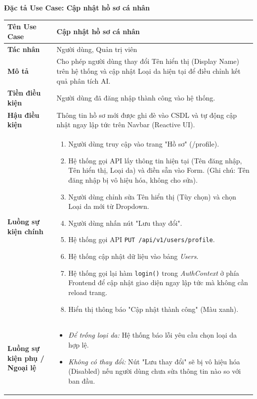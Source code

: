 \documentclass[12pt,a4paper]{article}
\begin{document}
\vspace{0.5cm}
\textbf{Đặc tả Use Case: Cập nhật hồ sơ cá nhân}

\begin{center}
\renewcommand{\arraystretch}{1.4}
\begin{tabular}{|p{4cm}|p{10cm}|}
\hline
\rowcolor{blue!15}
\textbf{Tên Use Case} & \textbf{Cập nhật hồ sơ cá nhân} \\ \hline
\textbf{Tác nhân} & Người dùng, Quản trị viên \\ \hline
\textbf{Mô tả} & Cho phép người dùng thay đổi Tên hiển thị (Display Name) trên hệ thống và cập nhật Loại da hiện tại để điều chỉnh kết quả phân tích AI. \\ \hline
\textbf{Tiền điều kiện} & Người dùng đã đăng nhập thành công vào hệ thống. \\ \hline
\textbf{Hậu điều kiện} & Thông tin hồ sơ mới được ghi đè vào CSDL và tự động cập nhật ngay lập tức trên Navbar (Reactive UI). \\ \hline
\textbf{Luồng sự kiện chính} & 
\begin{enumerate}
    \item Người dùng truy cập vào trang "Hồ sơ" (/profile).
    \item Hệ thống gọi API lấy thông tin hiện tại (Tên đăng nhập, Tên hiển thị, Loại da) và điền sẵn vào Form. (Ghi chú: Tên đăng nhập bị vô hiệu hóa, không cho sửa).
    \item Người dùng chỉnh sửa Tên hiển thị (Tùy chọn) và chọn Loại da mới từ Dropdown.
    \item Người dùng nhấn nút "Lưu thay đổi".
    \item Hệ thống gọi API \texttt{PUT /api/v1/users/profile}.
    \item Hệ thống cập nhật dữ liệu vào bảng \textit{Users}.
    \item Hệ thống gọi lại hàm \texttt{login()} trong \textit{AuthContext} ở phía Frontend để cập nhật giao diện ngay lập tức mà không cần reload trang.
    \item Hiển thị thông báo "Cập nhật thành công" (Màu xanh).
\end{enumerate} \\ \hline
\textbf{Luồng sự kiện phụ / Ngoại lệ} & 
\begin{itemize}
    \item \textit{Để trống loại da:} Hệ thống báo lỗi yêu cầu chọn loại da hợp lệ.
    \item \textit{Không có thay đổi:} Nút "Lưu thay đổi" sẽ bị vô hiệu hóa (Disabled) nếu người dùng chưa sửa thông tin nào so với ban đầu.
\end{itemize} \\ \hline
\end{tabular}
\end{center}
\end{document}
